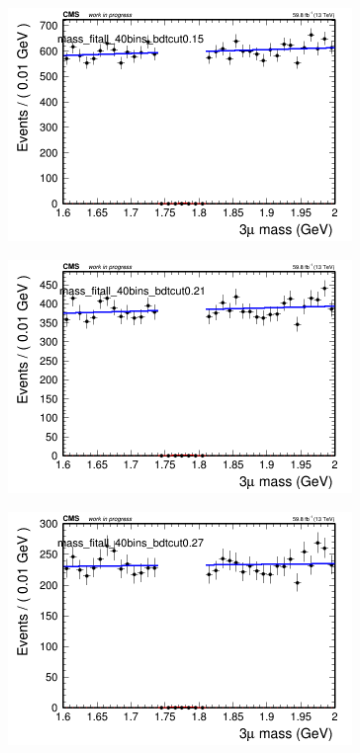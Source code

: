 \begin{figure}[H]
    \centering
    \begin{subfigure}{0.2\textwidth}
        \includegraphics[width=\textwidth]{power_law/plots/all/massfit_all_40bins_bdtcut0.15.png}
        \caption{}
    \end{subfigure}
    \begin{subfigure}{0.2\textwidth}
        \includegraphics[width=\textwidth]{power_law/plots/all/massfit_all_40bins_bdtcut0.21.png}
        \caption{}
    \end{subfigure}
    \begin{subfigure}{0.2\textwidth}
        \includegraphics[width=\textwidth]{power_law/plots/all/massfit_all_40bins_bdtcut0.27.png}

\end{subfigure}
\end{figure}
